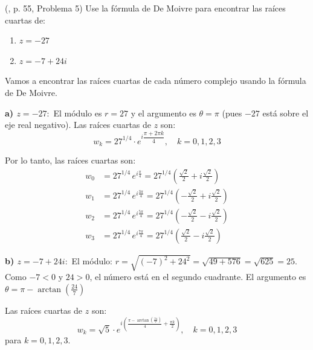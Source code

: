 \begin{prob} (\cite{andreescu2014complex}, p. 55, Problema 5) Use la fórmula de De Moivre para encontrar las raíces cuartas de:
\begin{multicols}{2}
\begin{enumerate}[$a)$]
\item $z=-27$
\item $z=-7+24i$
\end{enumerate}
\end{multicols}
\begin{myproof}
Vamos a encontrar las raíces cuartas de cada número complejo usando la fórmula de De Moivre.

\textbf{a) $z = -27:$} El módulo es $r = 27$ y el argumento es $\theta = \pi$ (pues $-27$ está sobre el eje real negativo). Las raíces cuartas de $z$ son:
\[
w_k = 27^{1/4} \cdot e^{i\dfrac{\pi + 2\pi k}{4}}, \quad k = 0,1,2,3
\]

Por lo tanto, las raíces cuartas son:
\[
\boxed{
\begin{aligned}
w_0 &= 27^{1/4} \, e^{i\frac{\pi}{4}} = 27^{1/4} \left(\frac{\sqrt{2}}{2} + i\frac{\sqrt{2}}{2}\right) \\
w_1 &= 27^{1/4} \, e^{i\frac{3\pi}{4}} = 27^{1/4} \left(-\frac{\sqrt{2}}{2} + i\frac{\sqrt{2}}{2}\right) \\
w_2 &= 27^{1/4} \, e^{i\frac{5\pi}{4}} = 27^{1/4} \left(-\frac{\sqrt{2}}{2} - i\frac{\sqrt{2}}{2}\right) \\
w_3 &= 27^{1/4} \, e^{i\frac{7\pi}{4}} = 27^{1/4} \left(\frac{\sqrt{2}}{2} - i\frac{\sqrt{2}}{2}\right)
\end{aligned}
}
\]

\textbf{b) $z = -7 + 24i:$} El módulo: $r = \sqrt{(-7)^2 + 24^2} = \sqrt{49 + 576} = \sqrt{625} = 25.$  Como $-7 < 0$ y $24 > 0$, el número está en el segundo cuadrante. El argumento es \(
\theta = \pi - \arctan\left(\frac{24}{7}\right)
\)

Las raíces cuartas de $z$ son:
\[
\boxed{
w_k = \sqrt{5} \cdot e^{i\left(\frac{\pi - \arctan\left(\frac{24}{7}\right)}{4} + \frac{\pi k}{2}\right)}, \quad k = 0,1,2,3
}
\]
para $k = 0,1,2,3$.

\end{myproof}

\end{prob}

